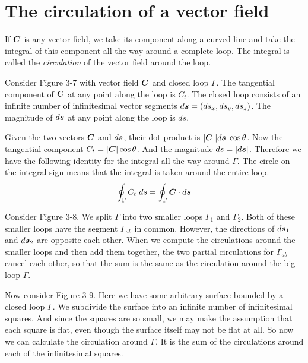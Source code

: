 \section{The circulation of a vector field}

If $\boldsymbol{C}$ is any vector field, we take its component along a curved line
and take the integral of this component all the way around a complete loop.
The integral is called the \emph{circulation} of the vector field around the loop.

Consider Figure 3-7 with vector field $\boldsymbol{C}$ and closed loop $\Gamma$.
The tangential component of $\boldsymbol{C}$ at any point along the loop is $C_t$.
The closed loop consists of an infinite number of infinitesimal vector segments 
$d\boldsymbol{s}=(ds_x,ds_y,ds_z)$.
The magnitude of $d\boldsymbol{s}$ at any point along the loop is $ds$.

Given the two vectors $\boldsymbol{C}$ and $d\boldsymbol{s}$, their dot product is $|\boldsymbol{C}||d\boldsymbol{s}|\cos\theta$.
Now the tangential component $C_t = |\boldsymbol{C}|\cos\theta$.
And the magnitude $ds=|d\boldsymbol{s}|$.
Therefore we have the following identity for the integral all the way around $\Gamma$.
The circle on the integral sign means that the integral is taken around the entire loop.
\begin{equation}
  \oint_\Gamma C_t \; ds = \oint_\Gamma \boldsymbol{C} \cdot d\boldsymbol{s}
\end{equation}

Consider Figure 3-8.
We split $\Gamma$ into two smaller loops $\Gamma_1$ and $\Gamma_2$.
Both of these smaller loops have the segment $\Gamma_{ab}$ in common.
However, the directions of $d\boldsymbol{s}_1$ and $d\boldsymbol{s}_2$ are opposite each other.
When we compute the circulations around the smaller loops and then add them together,
the two partial circulations for $\Gamma_{ab}$ cancel each other,
so that the sum is the same as the circulation around the big loop $\Gamma$.

Now consider Figure 3-9.
Here we have some arbitrary surface bounded by a closed loop $\Gamma$.
We subdivide the surface into an infinite number of infinitesimal squares.
And since the squares are so small, we may make the assumption that each square is flat, 
even though the surface itself may not be flat at all.
So now we can calculate the circulation around $\Gamma$.
It is the sum of the circulations around each of the infinitesimal squares.

